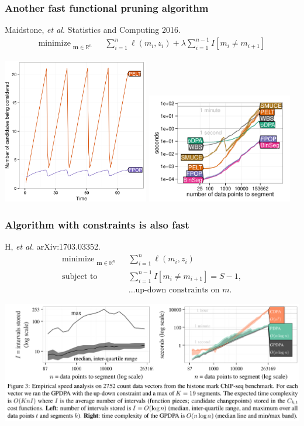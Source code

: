 \documentclass{beamer}
\DeclareMathOperator*{\minimize}{minimize}
\newcommand{\RR}{\mathbb R}
\begin{document}
\begin{frame}
  \frametitle{Another fast functional pruning algorithm}
  Maidstone, {\it et al.} Statistics and Computing 2016.
\vskip -0.5cm
\begin{align*}
    \minimize_{\substack{
  \mathbf m\in\RR^{n}
  }} &\ \ 
    \sum_{i=1}^n \ell( m_i,  z_i)  + \lambda{\sum_{i=1}^{n-1}I[m_{i}\neq m_{i+1}]}
  \nonumber 
\end{align*}

\centering
  \includegraphics[width=0.48\textwidth]{screenshot-Maidstone-figure-4}
\includegraphics[width=0.48\textwidth]{figure-systemtime-arrays-bins}
  
\end{frame}

\begin{frame}
  \frametitle{Algorithm with constraints is also fast}
  H, {\it et al.} arXiv:1703.03352.
\vskip -0.5cm
  \begin{align*}
    \minimize_{\substack{
  \mathbf m\in\RR^{n}
  }} &\ \ 
    \sum_{i=1}^n \ell( m_i,  z_i) 
\\
      \text{subject to} &\ \ {{\sum_{i=1}^{n-1} I[m_i\neq m_{i+1}]}=S-1,}
  \nonumber\\
  &\ \ \text{...up-down constraints on $m$.}
  \nonumber 
\end{align*}

\includegraphics[width=\textwidth]{screenshot-GPDPA-intervals}

\end{frame}
\end{document}
